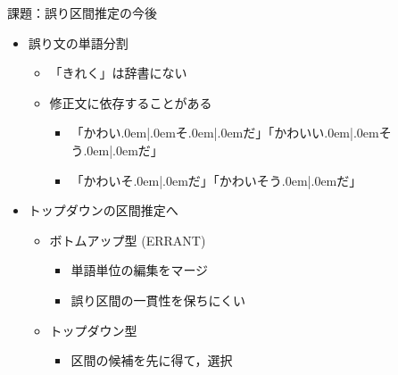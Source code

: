 \documentclass[12pt]{beamer}
\newcommand{\mynum}[2]{%
	{\color{#1}\fontsize{50pt}{0pt}\selectfont\dejavu{\char"#2}\hspace*{-0.35em}}
}
\begin{document}
\begin{frame}[t]
\begin{columns}[t]
\begin{column}{.33\linewidth}
			\begin{block}{\mynum{white}{277D}課題：誤り区間推定の今後}
				\begin{itemize}
					\item[\mynum{blue}{2776}] 誤り文の単語分割
						\begin{itemize}
							\item 「きれく」は辞書にない
							\item 修正文に依存することがある
								\begin{itemize}
									\item 「かわい\kern.0em|\kern.0emそ\kern.0em|\kern.0emだ」「かわいい\kern.0em|\kern.0emそう\kern.0em|\kern.0emだ」
									\item 「かわいそ\kern.0em|\kern.0emだ」「かわいそう\kern.0em|\kern.0emだ」
								\end{itemize}
						\end{itemize}
					\item[\mynum{blue}{2777}] トップダウンの区間推定へ
						\begin{itemize}
							\item ボトムアップ型 (ERRANT)
								\begin{itemize}
									\item 単語単位の編集をマージ
									\item 誤り区間の一貫性を保ちにくい
								\end{itemize}
							\item トップダウン型
								\begin{itemize}
									\item 区間の候補を先に得て，選択
								\end{itemize}
						\end{itemize}
				\end{itemize}
			\end{block}


\end{column}
\end{columns}
\end{frame}
\end{document}
